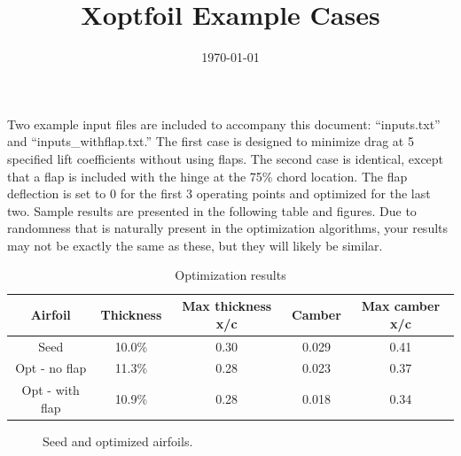 \documentclass[11pt]{article}
\begin{document}
\title{Xoptfoil Example Cases}
\date{\today}
\maketitle

Two example input files are included to accompany this document: ``inputs.txt'' and
``inputs\_withflap.txt.'' The first case is designed to minimize drag at 5 specified lift
coefficients without using flaps. The second case is identical, except that a flap is
included with the hinge at the 75\% chord location. The flap deflection is set to 0 for
the first 3 operating points and optimized for the last two. Sample results are presented
in the following table and figures.
Due to randomness that is naturally present in the optimization algorithms, your
results may not be exactly the same as these, but they will likely be similar.

\begin{table}[!ht]
\centering
\caption{Optimization results}
\begin{tabular}{c c c c c} \\ \hline\hline
Airfoil         & Thickness & Max thickness x/c & Camber & Max camber x/c \\ \hline
Seed            & 10.0\%    & 0.30              & 0.029  & 0.41           \\
Opt - no flap   & 11.3\%    & 0.28              & 0.023  & 0.37           \\
Opt - with flap & 10.9\%    & 0.28              & 0.018  & 0.34           \\
\end{tabular}
\label{table:results}
\end{table}

\begin{figure}[!h]
	\centering
	\caption{Seed and optimized airfoils.}
	\label{fig:airfoil}
\end{figure}
\end{document}
